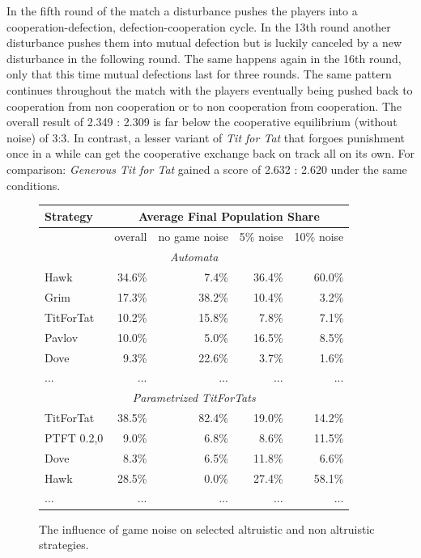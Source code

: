 In the fifth round of the match a disturbance pushes the players into a
cooperation-defection, defection-cooperation cycle. In the 13th round another
disturbance pushes them into mutual defection but is luckily canceled by a new
disturbance in the following round. The same happens again in the 16th round,
only that this time mutual defections last for three rounds. The same pattern
continues throughout the match with the players eventually being pushed back
to cooperation from non cooperation or to non cooperation from cooperation.
The overall result of 2.349 : 2.309 is far below the cooperative equilibrium
(without noise) of 3:3. In contrast, a lesser variant of {\em Tit for Tat}
that forgoes punishment once in a while can get the cooperative exchange back
on track all on its own. For comparison: {\em Generous Tit for Tat} gained a
score of 2.632 : 2.620 under the same conditions.

\begin{figure}
\begin{center}
\begin{tabular}{|l|r|r|r|r|}
\hline
{\bf Strategy} & \multicolumn{4}{c|}{{\bf Average Final Population Share}} \\
\hline
         & overall & no game noise & 5\% noise & 10\% noise \\ \hline
\multicolumn{5}{|c|}{{\em Automata}} \\ \hline
Hawk      & 34.6\%  &  7.4\% & 36.4\% & 60.0\% \\ 
Grim      & 17.3\%  & 38.2\% & 10.4\% &  3.2\% \\  
TitForTat & 10.2\%  & 15.8\% &  7.8\% &  7.1\% \\
Pavlov    & 10.0\%  &  5.0\% & 16.5\% &  8.5\% \\
Dove      &  9.3\%  & 22.6\% &  3.7\% &  1.6\% \\
...       &  ...    &  ...   &  ...   &  ...   \\
\hline
\multicolumn{5}{|c|}{{\em Parametrized TitForTats}} \\ \hline 
TitForTat     & 38.5\% & 82.4\% & 19.0\% & 14.2\% \\
PTFT 0.2,0    &  9.0\% &  6.8\% &  8.6\% & 11.5\% \\
Dove          &  8.3\% &  6.5\% & 11.8\% &  6.6\% \\
Hawk          & 28.5\% &  0.0\% & 27.4\% & 58.1\% \\
...           &  ...   &  ...   &  ...   &  ...   \\
\hline
\end{tabular}
\caption{\label{GameNoiseCharts} The influence of game noise on
  selected altruistic and non altruistic strategies.}
\end{center}
\end{figure}

